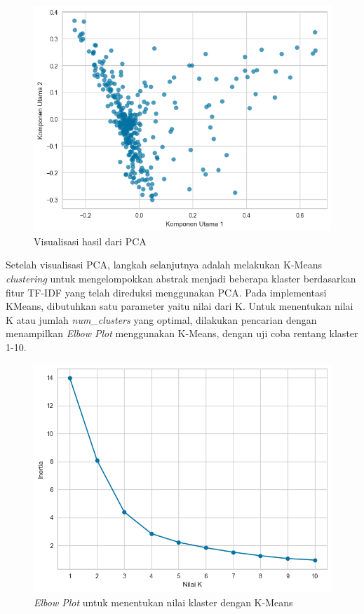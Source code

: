 \begin{figure}[H]
    \centering
    \includegraphics[width=0.7\linewidth]{img/4-221.png}
    \caption{Visualisasi hasil dari PCA}
    \label{fig:4-221}
\end{figure}

Setelah visualisasi PCA, langkah selanjutnya adalah melakukan K-Means \textit{clustering} untuk mengelompokkan abstrak menjadi beberapa klaster berdasarkan fitur TF-IDF yang telah direduksi menggunakan PCA. Pada implementasi KMeans, dibutuhkan satu parameter yaitu nilai dari K. Untuk menentukan nilai K atau jumlah \textit{num\_clusters} yang optimal, dilakukan pencarian dengan menampilkan \textit{Elbow Plot} menggunakan K-Means, dengan uji coba rentang klaster 1-10.

\begin{figure}[H]
    \centering
    \includegraphics[width=0.725\linewidth]{img/4-21.png}
    \caption{\textit{Elbow Plot} untuk menentukan nilai klaster dengan K-Means}
    \label{fig:4-21}
\end{figure}


